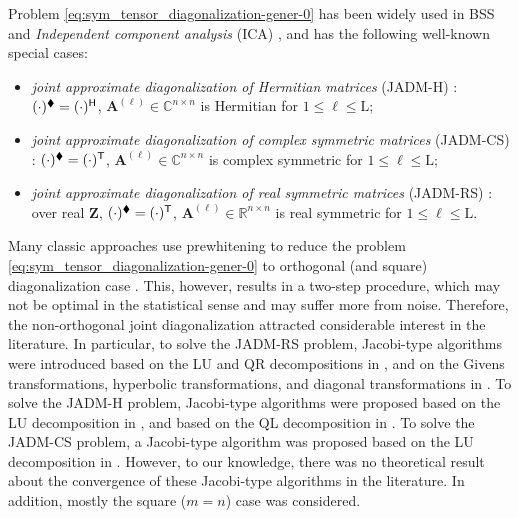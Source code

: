 \documentclass[final,onefignum,onetabnum]{siamart190516}
\newcommand{\matr}[1]{\boldsymbol{#1}}
\newcommand{\T}{{\sf T}} %
\renewcommand{\H}{{\sf H}} %
\newcommand{\RR}{\mathbb{R}}
\newcommand{\CC}{\mathbb{C}}
\newcommand{\matrelem}[1]{\mathrm{#1}}
\renewcommand{\H}{{\sf H}}      %
\renewcommand{\TH}{{\blacklozenge}}
\begin{document}
Problem \cref{eq:sym_tensor_diagonalization-gener-0} has been widely used in BSS  and \emph{Independent component analysis} (ICA)  \cite{chabriel2014joint,Como10:book,Afsa07:honolulu,andre2018new}, and has the following well-known special cases:
\begin{itemize}
\item \emph{joint approximate diagonalization of Hermitian matrices} (JADM-H) \cite{sorensen2009approximate,maurandi2014decoupled}: $(\cdot)^{\TH}=(\cdot)^{\H}$, $\matr{A}^{(\ell)}  \in\CC^{n\times n}$ is Hermitian for $1\leq\ell\leq \matrelem{L}$;
\item \emph{joint approximate diagonalization of complex symmetric matrices} (JADM-CS) \cite{maurandi2014decoupled}: $(\cdot)^{\TH}=(\cdot)^{\T}$, $\matr{A}^{(\ell)} \in\CC^{n\times n}$ is complex symmetric for $1\leq\ell\leq \matrelem{L}$;
\item \emph{joint approximate diagonalization of real symmetric matrices} (JADM-RS) \cite{afsari2004gradient,afsari2006simple}: over real $\matr{Z}$, $(\cdot)^{\TH}=(\cdot)^{\T}$, 
$\matr{A}^{(\ell)} \in\RR^{n\times n}$ is real symmetric for $1\leq\ell\leq \matrelem{L}$. 
\end{itemize}

Many classic approaches use prewhitening to reduce the problem \cref{eq:sym_tensor_diagonalization-gener-0} to orthogonal (and square) diagonalization case \cite{Cardoso93:JADE,cardoso1996jacobi,Como94:sp,LUC2017globally,LUC2018,li2020convergence,li2019jacobi,ULC2019}.
This, however, results in a two-step procedure, which may not be optimal in the statistical sense and may suffer more from noise. 
Therefore, the non-orthogonal joint diagonalization attracted considerable interest in the literature. 
In particular, to solve the JADM-RS problem, 
Jacobi-type algorithms were introduced based on the LU and QR decompositions in \cite{afsari2006simple}, and on the Givens transformations, hyperbolic transformations, and diagonal transformations in \cite[Eq. (9)]{souloumiac2009nonorthogonal}.  
To solve the JADM-H problem, Jacobi-type algorithms were proposed based on the LU decomposition in \cite{maurandi2014decoupled,maurandi2014jacobi}, and based on the QL decomposition in \cite{sorensen2009approximate}.
To solve the JADM-CS problem, a Jacobi-type algorithm was proposed based on the LU decomposition in \cite{maurandi2013fast,maurandi2014decoupled}. 
However, to our knowledge, there was no theoretical result about the convergence of these Jacobi-type algorithms in the literature.
In addition, mostly the square ($m=n$) case was considered. 
\end{document}
